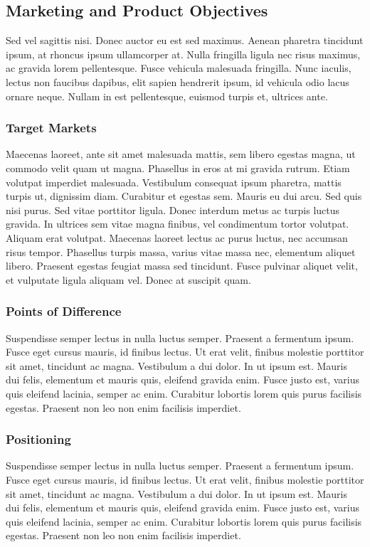 \documentclass[12pt, letterpaper]{article}
\begin{document}
\subsection{Marketing and Product Objectives}
Sed vel sagittis nisi. Donec auctor eu est sed maximus. Aenean pharetra tincidunt ipsum, at rhoncus ipsum ullamcorper at. Nulla fringilla ligula nec risus maximus, ac gravida lorem pellentesque. Fusce vehicula malesuada fringilla. Nunc iaculis, lectus non faucibus dapibus, elit sapien hendrerit ipsum, id vehicula odio lacus ornare neque. Nullam in est pellentesque, euismod turpis et, ultrices ante.
\subsubsection{Target Markets}
Maecenas laoreet, ante sit amet malesuada mattis, sem libero egestas magna, ut commodo velit quam ut magna. Phasellus in eros at mi gravida rutrum. Etiam volutpat imperdiet malesuada. Vestibulum consequat ipsum pharetra, mattis turpis ut, dignissim diam. Curabitur et egestas sem. Mauris eu dui arcu. Sed quis nisi purus. Sed vitae porttitor ligula. Donec interdum metus ac turpis luctus gravida. In ultrices sem vitae magna finibus, vel condimentum tortor volutpat. Aliquam erat volutpat. Maecenas laoreet lectus ac purus luctus, nec accumsan risus tempor. Phasellus turpis massa, varius vitae massa nec, elementum aliquet libero. Praesent egestas feugiat massa sed tincidunt. Fusce pulvinar aliquet velit, et vulputate ligula aliquam vel. Donec at suscipit quam.
\subsubsection{Points of Difference}
Suspendisse semper lectus in nulla luctus semper. Praesent a fermentum ipsum. Fusce eget cursus mauris, id finibus lectus. Ut erat velit, finibus molestie porttitor sit amet, tincidunt ac magna. Vestibulum a dui dolor. In ut ipsum est. Mauris dui felis, elementum et mauris quis, eleifend gravida enim. Fusce justo est, varius quis eleifend lacinia, semper ac enim. Curabitur lobortis lorem quis purus facilisis egestas. Praesent non leo non enim facilisis imperdiet.
\subsubsection{Positioning}
Suspendisse semper lectus in nulla luctus semper. Praesent a fermentum ipsum. Fusce eget cursus mauris, id finibus lectus. Ut erat velit, finibus molestie porttitor sit amet, tincidunt ac magna. Vestibulum a dui dolor. In ut ipsum est. Mauris dui felis, elementum et mauris quis, eleifend gravida enim. Fusce justo est, varius quis eleifend lacinia, semper ac enim. Curabitur lobortis lorem quis purus facilisis egestas. Praesent non leo non enim facilisis imperdiet.
\end{document}

